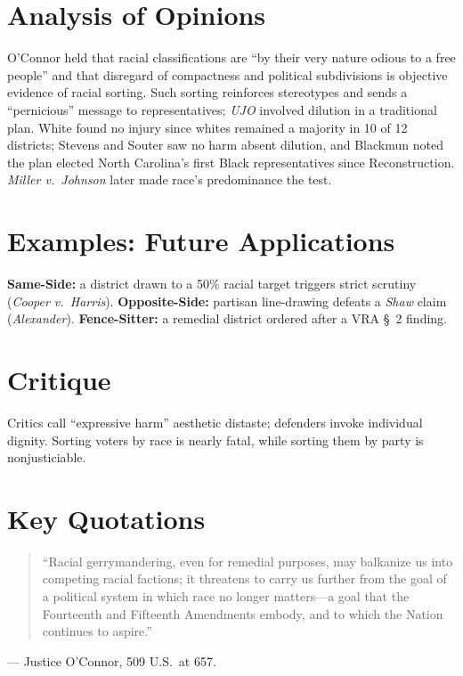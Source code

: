 \documentclass[12pt]{article}
\begin{document}
\section{Analysis of Opinions}
O'Connor held that racial classifications are ``by their very nature odious to a free people'' and that disregard of compactness and political subdivisions is objective evidence of racial sorting. Such sorting reinforces stereotypes and sends a ``pernicious'' message to representatives; \textit{UJO} involved dilution in a traditional plan. White found no injury since whites remained a majority in 10 of 12 districts; Stevens and Souter saw no harm absent dilution, and Blackmun noted the plan elected North Carolina's first Black representatives since Reconstruction. \textit{Miller v.\ Johnson} later made race's predominance the test.

\section{Examples: Future Applications}
\textbf{Same-Side:} a district drawn to a 50\% racial target triggers strict scrutiny (\textit{Cooper v.\ Harris}). \textbf{Opposite-Side:} partisan line-drawing defeats a \textit{Shaw} claim (\textit{Alexander}). \textbf{Fence-Sitter:} a remedial district ordered after a VRA \S\ 2 finding.

\section{Critique}
Critics call ``expressive harm'' aesthetic distaste; defenders invoke individual dignity. Sorting voters by race is nearly fatal, while sorting them by party is nonjusticiable.

\section{Key Quotations}
\begin{quote}
``Racial gerrymandering, even for remedial purposes, may balkanize us into competing racial factions; it threatens to carry us further from the goal of a political system in which race no longer matters---a goal that the Fourteenth and Fifteenth Amendments embody, and to which the Nation continues to aspire.''
\end{quote}
\noindent --- Justice O'Connor, 509 U.S.\ at 657.
\end{document}

